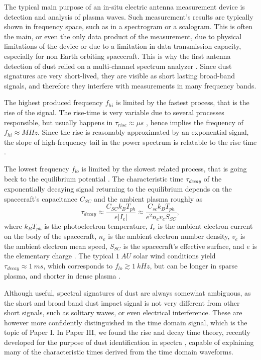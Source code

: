 The typical main purpose of an in-situ electric antenna measurement device is detection and analysis of plasma waves. Such measurement's results are typically shown in frequency space, such as in a spectrogram or a scalogram. This is often the main, or even the only data product of the measurement, due to physical limitations of the device or due to a limitation in data transmission capacity, especially for non Earth orbiting spacecraft. This is why the first antenna detection of dust relied on a multi-channel spectrum analyzer \citep{scarf1982voyager}. Since dust signatures are very short-lived, they are visible as short lasting broad-band signals, and therefore they interfere with measurements in many frequency bands. 

The highest produced frequency $f_{hi}$ is limited by the fastest process, that is the rise of the signal. The rise-time is very variable due to several processes responsible, but usually happens in $\tau_{rise} \approx \si{\mu s}$ \citep{meyer2017frequency,shen2023variability}, hence implies the frequency of $f_{hi} \approx \si{M Hz}$. Since the rise is reasonably approximated by an exponential signal, the slope of high-frequency tail in the power spectrum is relatable to the rise time \citep{meyer2017frequency}. 

The lowest frequency $f_{lo}$ is limited by the slowest related process, that is going beck to the equilibrium potential \citep{zaslavsky2015floating}. The characteristic time $\tau_{decay}$ of the exponentially decaying signal returning to the equilibrium depends on the spacecraft's capacitance $C_{SC}$ and the ambient plasma roughly as 
\begin{equation}    
\tau_{decay} \approx \frac{C_{SC} k_B T_{ph}}{e|I_{e}|} \approx \frac{C_{sc} k_B T_{ph}}{e^2 n_e v_e S_{SC}}, 
\end{equation}
where $k_B T_{ph}$ is the photoelectron temperature, $I_e$ is the ambient electron current on the body of the spacecraft, $n_e$ is the ambient electron number density, $v_e$ is the ambient electron mean speed, $S_{SC}$ is the spacecraft's effective surface, and $e$ is the elementary charge \citep{henri2011observations}. The typical $\SI{1}{AU}$ solar wind conditions yield $\tau_{decay} \approx \SI{1}{m s}$, which corresponds to $f_{lo} \gtrsim \SI{1}{kHz}$, but can be longer in sparse plasma, and shorter in dense plasma \citep{zaslavsky2015floating,vaverka2017detection,meyer2017frequency}. 

Although useful, spectral signatures of dust are always somewhat ambiguous, as the short and broad band dust impact signal is not very different from other short signals, such as solitary waves, or even electrical interference. These are however more confidently distinguished in the time domain signal, which is the topic of Paper I. In Paper III, we found the rise and decay time theory, recently developed for the purpose of dust identification in spectra \citep{meyer2017frequency}, capable of explaining many of the characteristic times derived from the time domain waveforms.

